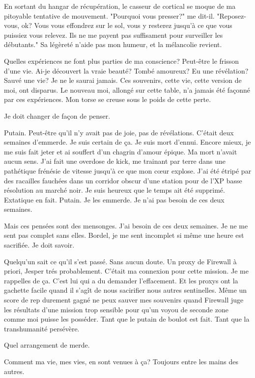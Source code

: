 En sortant du hangar de récupération, le casseur de cortical se moque de ma pitoyable tentative de mouvement. "Pourquoi vous presser?" me dit-il. "Reposez-vous, ok? Vous vous effondrez sur le sol, vous y resterez jusqu'à ce que vous puissiez vous relevez. Ils ne me payent pas suffisament pour surveiller les débutants."  Sa légèreté n'aide pas mon humeur, et la mélancolie revient. 

Quelles expériences ne font plus parties de ma conscience? Peut-être le frisson d'une vie. Ai-je découvert la vraie beauté? Tombé amoureux? Eu une révélation? Sauvé une vie? Je ne le saurai jamais. Ces souvenirs, cette vie, cette version de moi, ont disparus. Le nouveau moi, allongé sur cette table, n'a jamais été façonné par ces expériences. Mon torse se creuse sous le poids de cette perte. 

Je doit changer de façon de penser. 

Putain. Peut-être qu'il n'y avait pas de joie, pas de révélations. C'était deux semaines d'emmerde. Je suis certain de ça. Je suis mort d'ennui. Encore mieux, je me suis fait jeter et ai souffert d'un chagrin d'amour épique. Ma mort n'avait aucun sens. J'ai fait une overdose de kick, me trainant par terre dans une pathétique frénésie de vitesse jusqu'à ce que mon cœur explose. J'ai été étripé par des racailles fauchées dans un corridor obscur d'une station pour de l'XP basse résolution au marché noir. Je suis heureux que le temps ait été supprimé. Extatique en fait. Putain. Je les emmerde. Je n'ai pas besoin de ces deux semaines. 

Mais ces pensées sont des mensonges. J'ai besoin de ces deux semaines. Je ne me sent pas complet sans elles. Bordel, je me sent incomplet si même une heure est sacrifiée. Je doit savoir. 

Quelqu'un sait ce qu'il s'est passé. Sans aucun doute. Un proxy de Firewall à priori, Jesper trés probablement. C'était ma connexion pour cette mission. Je me rappelles de ça. C'est lui qui a du demander l'effacement. Et les proxys ont la gachette facile quand il s'agît de nous sacirifier nous autres sentinelles. Même un score de rep durement gagné ne peux sauver mes souvenirs quand Firewall juge les résultats d'une mission trop sensible pour qu'un voyou de seconde zone comme moi puisse les posséder. Tant que le putain de boulot est fait. Tant que la transhumanité persévère. 

Quel arrangement de merde. 

Comment ma vie, mes vies, en sont venues à ça? Toujours entre les mains des autres. 

